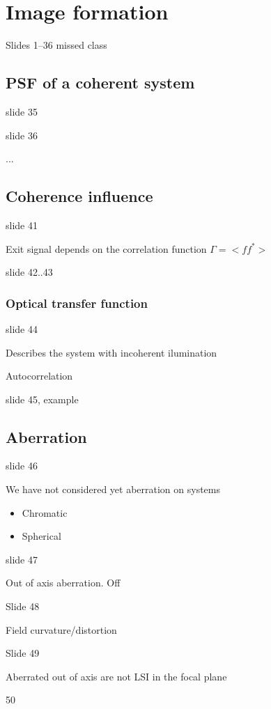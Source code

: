 \documentclass[../main/main.tex]{subfiles}
\begin{document}
\chapter{Image formation}

Slides 1--36 missed class

\section{PSF of a coherent system}

slide 35

slide 36

...


\section{Coherence influence}

slide 41

Exit signal depends on the correlation function $\Gamma = <f f^*>$

slide 42..43


\subsection{Optical transfer function}
slide 44

Describes the system with incoherent ilumination

Autocorrelation

slide 45, example

\section{Aberration}
slide 46

We have not considered yet aberration on systems

\begin{itemize}
	\item Chromatic
	\item Spherical

\end{itemize}

slide 47

Out of axis aberration. Off

Slide 48

Field curvature/distortion

Slide 49

Aberrated out of axis are not LSI in the focal plane

50
\end{document}
